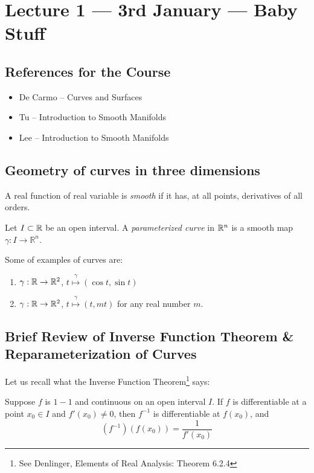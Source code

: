 \section{Lecture 1 ---  3rd January --- Baby Stuff}

\subsection{References for the Course}
\begin{itemize}
    \item De Carmo -- Curves and Surfaces
    \item Tu -- Introduction to Smooth Manifolds
    \item Lee -- Introduction to Smooth Manifolds
\end{itemize}

\subsection{Geometry of curves in three dimensions}
\begin{definition}[smooth]
    A real function of real variable is \textit{smooth} if it has, at all points, derivatives of all orders.
    \label{def:smooth}
\end{definition}
\begin{definition}     
Let $I \subset \mathbb R$ be an open interval. A \textit{parameterized curve} in $\mathbb R ^{n}$ is a smooth map $\gamma : I \to \mathbb R ^{n}$.
    \label{def:parameterized curve}
\end{definition}

\begin{example}
    Some of examples of curves are:
    \begin{enumerate}
	\item $\gamma : \mathbb R \to \mathbb R ^{2}$, $t \stackrel{\gamma}{\mapsto} \left( \cos t, \sin t \right)$
	\item $\gamma : \mathbb R \to \mathbb R ^{2}$, $t \stackrel{\gamma}{\mapsto} \left( t, mt \right)$ for any real number $m$.
    \end{enumerate}
\end{example}

\subsection{Brief Review of Inverse Function Theorem \& Reparameterization of Curves}

Let us recall what the Inverse Function Theorem\footnote{See Denlinger, Elements of Real Analysis: Theorem 6.2.4} says:
\begin{theorem}
    Suppose $f$ is $1-1$ and continuous on an open interval $I$. If $f$ is differentiable at a point $x_{0} \in I$ and $f' \left( x_0 \right) \ne 0$, then $f^{-1}$ is differentiable at $f\left( x_{0} \right)$, and 
    \begin{equation*}
	\left( f^{-1} \right) \left( f\left( x_0 \right) \right) = \frac{1}{f'\left( x_{0} \right)}
    \end{equation*}
    \label{thm:inv-fn-thm-in-1D}
\end{theorem}
 
